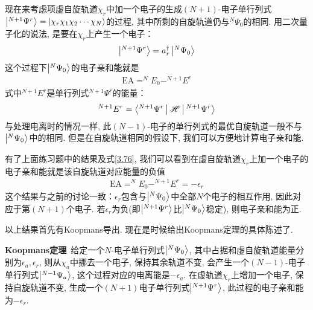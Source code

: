 
现在来考虑项虚自旋轨道$\chi_r$中加一个电子的生成$(N+1)$-电子单行列式$\Ket{^{N+1}\Psi^r}=\Ket{\chi_r\chi_1\chi_2\cdots\chi_N}$的过程, 
其中所剩的自旋轨道仍与$^N\Psi_0$的相同. 
用二次量子化的说法, 
是要在$\chi_r$上产生一个电子：
\begin{align}
	\Ket{^{N+1}\Psi^r} = a^\dagger_r\Ket{^N\Psi_0}
\end{align}
这个过程下$\Ket{^N\Psi_0}$的电子亲和能就是
\begin{align}
	\mathrm{EA} = ^NE_0 - ^{N+1}E^r
\end{align}
式中$ ^{N+1}E^r$是单行列式$^{N+1}\Psi^r$的能量：
\begin{align}
	^{N+1}E^r = \Braket{^{N+1}\Psi^r|\mathscr{H}|^{N+1}\Psi^r}
\end{align}
与处理电离时的情况一样, 
此$(N-1)$-电子的单行列式的最优自旋轨道一般不与$\Ket{^N\Psi_0}$中的相同. 
但是在自旋轨道相同的假设下, 
我们可以方便地计算电子亲和能.


有了上面练习题中的结果及式\eqref{3.76}, 
我们可以看到在虚自旋轨道$\chi_r$上加一个电子的电子亲和能就是该自旋轨道对应能量的负值
\begin{align}
	\mathrm{EA} = ^{N}E_0 - ^{N+1}E^r = -\epsilon_r
\end{align}
这个结果与之前的讨论一致：$\epsilon_r$包含与$\Ket{^N\Psi_0}$中全部$N$个电子的相互作用, 
因此对应于第$(N+1)$个电子. 
若$\epsilon_r$为负(即$\Ket{^{N+1}\Psi^r}$比$\Ket{^N\Psi_0}$稳定), 
则电子亲和能为正.


以上结果首先有Koopmans导出. 
现在是时候给出Koopmans定理的具体陈述了.


\textbf{Koopmans定理}\ 给定一个$N$-电子\hft 单行列式$\Ket{^N\Psi_0}$, 其中占据和虚自旋轨道能量分别为$\epsilon_a,\epsilon_r$, 则从$\chi_a$中挪去一个电子, 保持其余轨道不变, 会产生一个$(N-1)$-电子单行列式$\Ket{^{N-1}\Psi_a}$, 这个过程对应的电离能是$-\epsilon_a$. 
在虚轨道$\chi_r$上增加一个电子, 保持自旋轨道不变, 生成一个$(N+1)$电子单行列式$\Ket{^{N+1}\Psi^r}$, 此过程的电子亲和能为$-\epsilon_r$.


